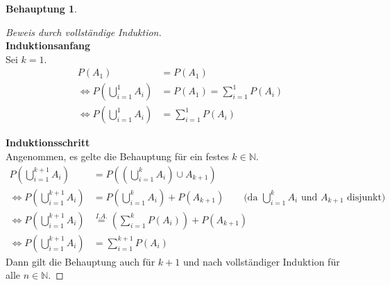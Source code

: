 \documentclass[a4paper]{scrartcl}
\newtheorem*{behaupt}{Behauptung}
\newcommand{\gdw}{\Leftrightarrow}
\begin{document}
\begin{enumerate}[label=\bfseries\arabic*.]
\begin{enumerate}[label=(\roman*)]
\begin{behaupt}
                \end{behaupt}
                \begin{proof}[Beweis durch vollständige Induktion] \hfill \\
                    \textbf{Induktionsanfang} \\
                    Sei $k = 1$.
                    \begin{equation}
                        \begin{split}
                            P(A_1) &= P(A_1) \\
                            \gdw P \left( \bigcup_{i=1}^1 A_i \right)
                            &= P(A_1) = \sum_{i=1}^1 P(A_i) \\
                            \gdw P \left( \bigcup_{i=1}^1 A_i \right)
                            &= \sum_{i=1}^1 P(A_i)
                        \end{split}
                    \end{equation}
                    
                    \textbf{Induktionsschritt} \\
                    Angenommen, es gelte die Behauptung für ein festes
                    $k \in  \mathbb{N}$.
                    \begin{equation}
                        \begin{split}
                            P \left( \bigcup_{i=1}^{k+1} A_i \right)
                            &= P \left( \left( \bigcup_{i=1}^k A_i \right)
                            \cup A_{k+1} \right) \\
                            \gdw P \left( \bigcup_{i=1}^{k+1} A_i \right)
                            &= P \left( \bigcup_{i=1}^k A_i \right) + P (A_{k+1})
                            \qquad \text{(da }\bigcup_{i=1}^{k} A_i \text{ und } A_{k+1} \text{ disjunkt)} \\
                            \gdw P \left( \bigcup_{i=1}^{k+1} A_i \right)
                            &\stackrel{I.A.}{=} \left( \sum_{i=1}^k P(A_i) \right)
                            + P (A_{k+1}) \\
                            \gdw P \left( \bigcup_{i=1}^{k+1} A_i \right)
                            &= \sum_{i=1}^{k+1} P(A_i)
                        \end{split}
                    \end{equation}
                    Dann gilt die Behauptung auch für $k+1$ und nach
                    vollständiger Induktion für alle $n \in \mathbb{N}$.
                \end{proof}


\end{enumerate}
\end{enumerate}
\end{document}
